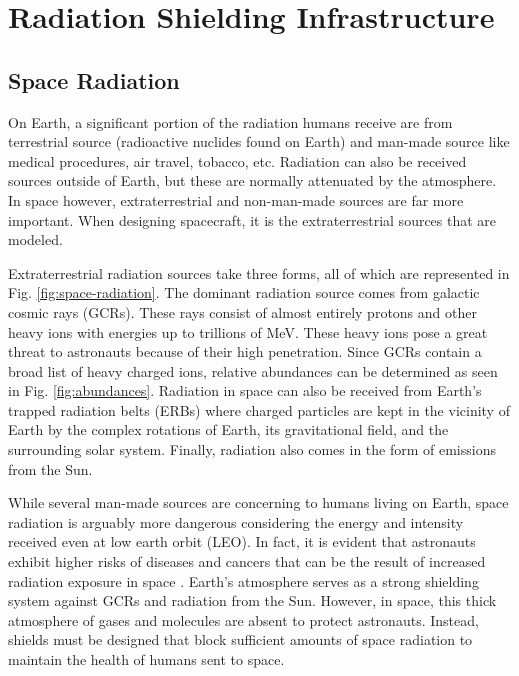 \section{Radiation Shielding Infrastructure}

\subsection{Space Radiation}

On Earth, a significant portion of the radiation humans receive \cite{lamarsh} are from terrestrial source (radioactive nuclides found on Earth) and man-made source like medical procedures, air travel, tobacco, etc. Radiation can also be received sources outside of Earth, but these are normally attenuated by the atmosphere. In space however, extraterrestrial and non-man-made sources are far more important. When designing spacecraft, it is the extraterrestrial sources that are modeled.

Extraterrestrial radiation sources take three forms, all of which are represented in Fig. \ref{fig:space-radiation}. The dominant radiation source comes from galactic cosmic rays (GCRs). These rays consist of almost entirely protons and other heavy ions with energies up to trillions of MeV. These heavy ions pose a great threat to astronauts because of their high penetration. Since GCRs contain a broad list of heavy charged ions, relative abundances can be determined as seen in Fig. \ref{fig:abundances}. Radiation in space can also be received from Earth’s trapped radiation belts (ERBs) where charged particles are kept in the vicinity of Earth by the complex rotations of Earth, its gravitational field, and the surrounding solar system. Finally, radiation also comes in the form of emissions from the Sun.

While several man-made sources are concerning to humans living on Earth, space radiation is arguably more dangerous considering the energy and intensity received even at low earth orbit (LEO). In fact, it is evident that astronauts exhibit higher risks of diseases and cancers that can be the result of increased radiation exposure in space \cite{nature-apollo}. Earth’s atmosphere serves as a strong shielding system against GCRs and radiation from the Sun. However, in space, this thick atmosphere of gases and molecules are absent to protect astronauts. Instead, shields must be designed that block sufficient amounts of space radiation to maintain the health of humans sent to space.


